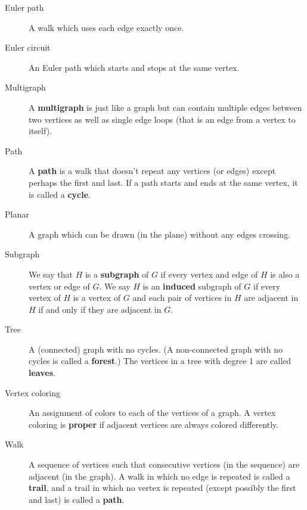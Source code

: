 \documentclass[11pt,]{book}
\newcommand{\terminology}[1]{\textbf{#1}}
\theoremstyle{ptxplainnotitle}
\theoremstyle{ptxplaintitle}
\theoremstyle{ptxdefinitionnotitle}
\theoremstyle{ptxdefinitiontitle}
\theoremstyle{ptxdefinitionnotitle}
\theoremstyle{ptxdefinitiontitle}
\theoremstyle{ptxdefinitionnotitle}
\theoremstyle{ptxdefinitiontitle}
\theoremstyle{ptxdefinitiontitlenonumber}
\theoremstyle{ptxdefinitiontitlenonumber}
\numberwithin{equation}{chapter}
\begin{document}
\begin{description}
\item[{Euler path}]\hypertarget{li-1284}{}\hypertarget{p-2621}{}%
A walk which uses each edge exactly once.%
\item[{Euler circuit}]\hypertarget{li-1285}{}\hypertarget{p-2622}{}%
 An Euler path which starts and stops at the same vertex.%
\item[{Multigraph}]\hypertarget{li-1286}{}\hypertarget{p-2623}{}%
 A \terminology{multigraph} is just like a graph but can contain multiple edges between two vertices as well as single edge loops (that is an edge from a vertex to itself).%
\item[{Path}]\hypertarget{li-1287}{}\hypertarget{p-2624}{}%
A \terminology{path} is a walk that doesn't repeat any vertices (or edges) except perhaps the first and last.  If a path starts and ends at the same vertex, it is called a \terminology{cycle}.%
\item[{Planar}]\hypertarget{li-1288}{}\hypertarget{p-2625}{}%
 A graph which can be drawn (in the plane) without any edges crossing.%
\item[{Subgraph}]\hypertarget{li-1289}{}\hypertarget{p-2626}{}%
 We say that \(H\) is a \terminology{subgraph} of \(G\) if every vertex and edge of \(H\) is also a vertex or edge of \(G\). We say \(H\) is an \terminology{induced} subgraph of \(G\) if every vertex of \(H\) is a vertex of \(G\) and each pair of vertices in \(H\) are adjacent in \(H\) if and only if they are adjacent in \(G\).%
\item[{Tree}]\hypertarget{li-1290}{}\hypertarget{p-2627}{}%
 A (connected) graph with no cycles. (A non-connected graph with no cycles is called a \terminology{forest}.) The vertices in a tree with degree 1 are called \terminology{leaves}.%
\item[{Vertex coloring}]\hypertarget{li-1291}{}\hypertarget{p-2628}{}%
 An assignment of colors to each of the vertices of a graph. A vertex coloring is \terminology{proper} if adjacent vertices are always colored differently.%
\item[{Walk}]\hypertarget{li-1292}{}\hypertarget{p-2629}{}%
 A sequence of vertices such that consecutive vertices (in the sequence) are adjacent (in the graph). A walk in which no edge is repeated is called a \terminology{trail}, and a trail in which no vertex is repeated (except possibly the first and last) is called a \terminology{path}.%
\end{description}
%
\typeout{************************************************}
\typeout{************************************************}
\end{document}
